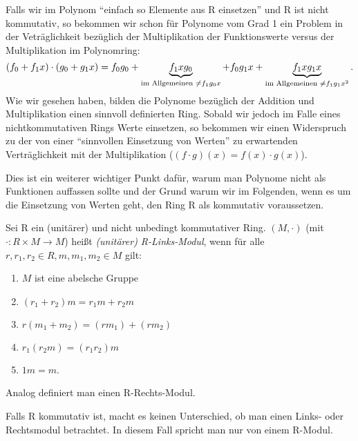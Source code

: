 \documentclass[10pt]{scrbook}
\begin{document}
\begin{Bem}
Falls wir im Polynom "`einfach so Elemente aus R einsetzen"' und R ist nicht kommutativ, so bekommen wir schon für Polynome vom Grad 1 ein Problem in der Veträglichkeit bezüglich der Multiplikation der Funktionswerte versus der Multiplikation im Polynomring:
\begin{displaymath}
	(f_0+f_1 x)\cdot (g_0+g_1 x)=f_0 g_0+\underbrace{f_1 x g_0}_{\textnormal{im Allgemeinen }\neq f_1 g_0 x}+f_0 g_1 x+\underbrace{f_1 x g_1 x}_{\textnormal{im Allgemeinen }\neq f_1 g_1 x^2}.
\end{displaymath}
Wie wir gesehen haben, bilden die Polynome bezüglich der Addition und Multiplikation einen sinnvoll definierten Ring. Sobald wir jedoch im Falle eines nichtkommutativen Rings Werte einsetzen, so bekommen wir einen Widerspruch zu der von einer "`sinnvollen Einsetzung von Werten"' zu erwartenden Verträglichkeit mit der Multiplikation ($(f\cdot g)(x)=f(x)\cdot g(x)$).

Dies ist ein weiterer wichtiger Punkt dafür, warum man Polynome nicht als Funktionen auffassen sollte und der Grund warum wir im Folgenden, wenn es um die Einsetzung von Werten geht, den Ring R als kommutativ voraussetzen.
\end{Bem}

\begin{Def}
Sei R ein (unitärer) und nicht unbedingt kommutativer Ring. $(M, \cdot)$ (mit $\cdot: R\times M \rightarrow M$) heißt \emph{(unitärer) R-Links-Modul}, wenn für alle $r, r_1, r_2\in R, m, m_1, m_2\in M$ gilt:
\begin{enumerate}
	\item $M$ ist eine abelsche Gruppe
	\item $(r_1+r_2) m = r_1 m+r_2 m$
	\item $r (m_1+m_2)=(r m_1)+(r m_2)$
	\item $r_1 (r_2 m) = (r_1 r_2) m$
	\item $1 m=m$.
\end{enumerate}
\end{Def}

\begin{Bem}
Analog definiert man einen R-Rechts-Modul.
\end{Bem}

\begin{Def}
Falls R kommutativ ist, macht es keinen Unterschied, ob man einen Links- oder Rechtsmodul betrachtet. In diesem Fall spricht man nur von einem R-Modul.
\end{Def}
\end{document}
